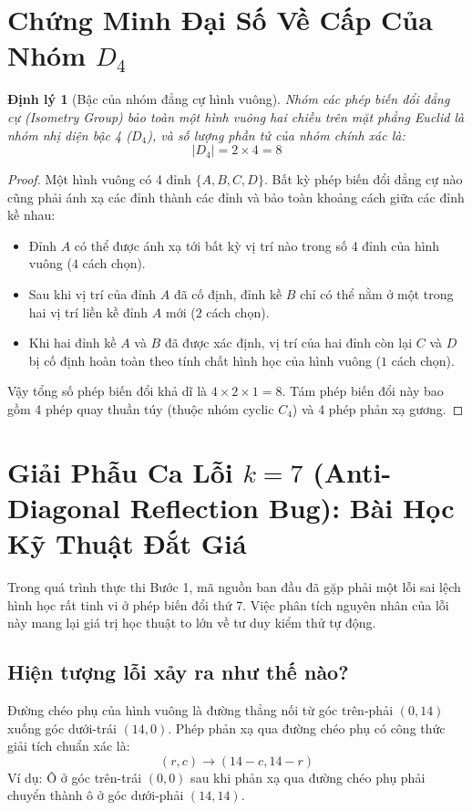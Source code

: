 \documentclass[11pt,a4paper]{report}
\newtheorem{theorem}{Định lý}[chapter]
\begin{document}
\section{Chứng Minh Đại Số Về Cấp Của Nhóm $D_4$}

\begin{theorem}[Bậc của nhóm đẳng cự hình vuông]
Nhóm các phép biến đổi đẳng cự (Isometry Group) bảo toàn một hình vuông hai chiều trên mặt phẳng Euclid là nhóm nhị diện bậc 4 ($D_4$), và số lượng phần tử của nhóm chính xác là:
\begin{equation}
    |D_4| = 2 \times 4 = 8
\end{equation}
\end{theorem}

\begin{proof}
Một hình vuông có 4 đỉnh $\{A, B, C, D\}$. Bất kỳ phép biến đổi đẳng cự nào cũng phải ánh xạ các đỉnh thành các đỉnh và bảo toàn khoảng cách giữa các đỉnh kề nhau:
\begin{itemize}
    \item Đỉnh $A$ có thể được ánh xạ tới bất kỳ vị trí nào trong số 4 đỉnh của hình vuông ($4$ cách chọn).
    \item Sau khi vị trí của đỉnh $A$ đã cố định, đỉnh kề $B$ chỉ có thể nằm ở một trong hai vị trí liền kề đỉnh $A$ mới ($2$ cách chọn).
    \item Khi hai đỉnh kề $A$ và $B$ đã được xác định, vị trí của hai đỉnh còn lại $C$ và $D$ bị cố định hoàn toàn theo tính chất hình học của hình vuông ($1$ cách chọn).
\end{itemize}
Vậy tổng số phép biến đổi khả dĩ là $4 \times 2 \times 1 = 8$. Tám phép biến đổi này bao gồm 4 phép quay thuần túy (thuộc nhóm cyclic $C_4$) và 4 phép phản xạ gương.
\end{proof}

\section{Giải Phẫu Ca Lỗi $k=7$ (Anti-Diagonal Reflection Bug): Bài Học Kỹ Thuật Đắt Giá}

Trong quá trình thực thi Bước 1, mã nguồn ban đầu đã gặp phải một lỗi sai lệch hình học rất tinh vi ở phép biến đổi thứ 7. Việc phân tích nguyên nhân của lỗi này mang lại giá trị học thuật to lớn về tư duy kiểm thử tự động.

\subsection{Hiện tượng lỗi xảy ra như thế nào?}
Đường chéo phụ của hình vuông là đường thẳng nối từ góc trên-phải $(0, 14)$ xuống góc dưới-trái $(14, 0)$. Phép phản xạ qua đường chéo phụ có công thức giải tích chuẩn xác là:
\begin{equation}
    (r, c) \longrightarrow (14 - c, 14 - r)
\end{equation}
Ví dụ: Ô ở góc trên-trái $(0, 0)$ sau khi phản xạ qua đường chéo phụ phải chuyển thành ô ở góc dưới-phải $(14, 14)$.
\end{document}
